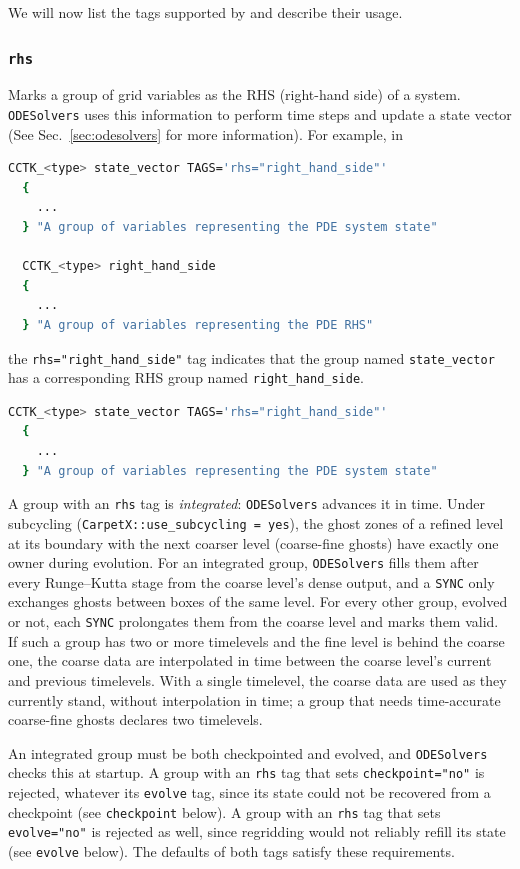 We will now list the tags supported by \CarpetX\space and describe their usage.

\subsubsection{\texttt{rhs}}

Marks a group of grid variables as the RHS (right-hand side) of a system. \texttt{ODESolvers} uses this information to perform time steps and update a state vector (See Sec.~\ref{sec:odesolvers} for more information). For example, in
%
\begin{lstlisting}[language=bash]
  CCTK_<type> state_vector TAGS='rhs="right_hand_side"'
  {
    ...
  } "A group of variables representing the PDE system state"

  CCTK_<type> right_hand_side
  {
    ...
  } "A group of variables representing the PDE RHS"
\end{lstlisting}
%
the \texttt{rhs="right\_hand\_side"} tag indicates that the group named \texttt{state\_vector} has a corresponding RHS group named \texttt{right\_hand\_side}.

\begin{lstlisting}[language=bash]
  CCTK_<type> state_vector TAGS='rhs="right_hand_side"'
  {
    ...
  } "A group of variables representing the PDE system state"
\end{lstlisting}

A group with an \texttt{rhs} tag is \emph{integrated}: \texttt{ODESolvers} advances it in time. Under subcycling (\texttt{CarpetX::use\_subcycling = yes}), the ghost zones of a refined level at its boundary with the next coarser level (coarse-fine ghosts) have exactly one owner during evolution. For an integrated group, \texttt{ODESolvers} fills them after every Runge--Kutta stage from the coarse level's dense output, and a \texttt{SYNC} only exchanges ghosts between boxes of the same level. For every other group, evolved or not, each \texttt{SYNC} prolongates them from the coarse level and marks them valid. If such a group has two or more timelevels and the fine level is behind the coarse one, the coarse data are interpolated in time between the coarse level's current and previous timelevels. With a single timelevel, the coarse data are used as they currently stand, without interpolation in time; a group that needs time-accurate coarse-fine ghosts declares two timelevels.

An integrated group must be both checkpointed and evolved, and \texttt{ODESolvers} checks this at startup. A group with an \texttt{rhs} tag that sets \texttt{checkpoint="no"} is rejected, whatever its \texttt{evolve} tag, since its state could not be recovered from a checkpoint (see \texttt{checkpoint} below). A group with an \texttt{rhs} tag that sets \texttt{evolve="no"} is rejected as well, since regridding would not reliably refill its state (see \texttt{evolve} below). The defaults of both tags satisfy these requirements.

